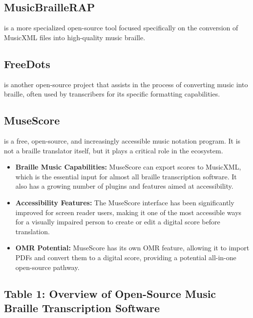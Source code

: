 \subsection{MusicBrailleRAP}\label{ch10:ssec:musicbraillerap}
 is a more specialized open-source tool focused specifically on the conversion of \gls{MusicXML} files into high-quality music braille.

\subsection{FreeDots}\label{ch10:ssec:freedots}
 is another open-source project that assists in the process of converting music into braille, often used by transcribers for its specific formatting capabilities.

\subsection{MuseScore}\label{ch10:ssec:musescore}
 is a free, open-source, and increasingly accessible music notation program. It is not a braille translator itself, but it plays a critical role in the ecosystem.
\begin{itemize}
	\item \textbf{Braille Music Capabilities:} MuseScore can export scores to \gls{MusicXML}, which is the essential input for almost all braille transcription software. It also has a growing number of plugins and features aimed at accessibility.
	\item \textbf{Accessibility Features:} The MuseScore interface has been significantly improved for screen reader users, making it one of the most accessible ways for a visually impaired person to create or edit a digital score before translation.
	\item \textbf{OMR Potential:} MuseScore has its own \gls{OMR} feature, allowing it to import PDFs and convert them to a digital score, providing a potential all-in-one open-source pathway.
\end{itemize}

\subsection{Table 1: Overview of Open-Source Music Braille Transcription Software}\label{ch10:ssec:table-open-source}

